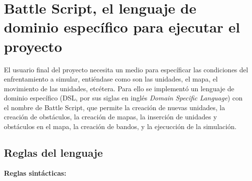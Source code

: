 \section{Battle Script, el lenguaje de dominio específico para ejecutar el proyecto}

El usuario final del proyecto necesita un medio para específicar las condiciones del enfrentamiento a simular, entiéndase como son las unidades, el mapa, el movimiento de las unidades, etcétera. Para ello se implementó un lenguaje de dominio específico (DSL, por sus siglas en inglés \textit{Domain Specific Language}) con el nombre de Battle Script, que permite la creación de nuevas unidades, la creación de obstáculos, la creación de mapas, la inserción de unidades y obstáculos en el mapa, la creación de bandos, y la ejecucción de la simulación.

\subsection{Reglas del lenguaje}

\textbf{Reglas sint\'acticas:}


